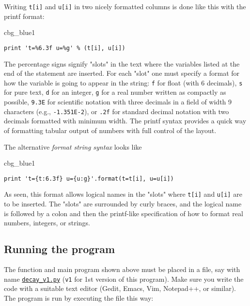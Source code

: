 \documentclass[graybox,sectrefs,envcountresetchap,open=right,final]{svmonodo}
\newenvironment{_cod_tight}[1]{
   \def\FrameCommand{\colorbox{#1}}
   \FrameRule0.6pt\MakeFramed {\FrameRestore}\vskip3mm}
   {\vskip0mm\endMakeFramed}
\newenvironment{cod}[1]{
\bgroup\rmfamily
\fboxsep=0mm\relax
\begin{_cod_tight}{#1}
\list{}{\parsep=-2mm\parskip=0mm\topsep=0pt\leftmargin=2mm
\rightmargin=2\leftmargin\leftmargin=4pt\relax}
\item\relax}
{\endlist\end{_cod_tight}\egroup}
\begin{document}

Writing \texttt{t[i]} and \texttt{u[i]} in two nicely formatted columns is done like
this with the printf format:

\begin{cod}{cbg_blue1}\begin{Verbatim}[numbers=none,fontsize=\fontsize{9pt}{9pt},baselinestretch=0.95,xleftmargin=2mm]
print 't=%6.3f u=%g' % (t[i], u[i])
\end{Verbatim}
\end{cod}
\noindent
The percentage signs signify "slots" in the text where the variables
listed at the end of the statement are inserted. For each "slot" one
must specify a format for how the variable is going to appear in the
string: \texttt{f} for float (with 6 decimals),
\texttt{s} for pure text, \texttt{d} for an integer, \texttt{g} for a real number
written as compactly as possible, \texttt{9.3E} for scientific notation with
three decimals in a field of width 9 characters (e.g., \texttt{-1.351E-2}),
or \texttt{.2f} for standard decimal notation with two decimals
formatted with minimum width. The printf syntax provides a quick way
of formatting tabular output of numbers with full control of the
layout.


The alternative \emph{format string syntax} looks like
\begin{cod}{cbg_blue1}\begin{Verbatim}[numbers=none,fontsize=\fontsize{9pt}{9pt},baselinestretch=0.95,xleftmargin=2mm]
print 't={t:6.3f} u={u:g}'.format(t=t[i], u=u[i])
\end{Verbatim}
\end{cod}
\noindent
As seen, this format allows logical names in the "slots" where
\texttt{t[i]} and \texttt{u[i]} are to be inserted. The "slots" are surrounded
by curly braces, and the logical name is followed by a colon and
then the printf-like specification of how to format real numbers,
integers, or strings.

\subsection{Running the program}

The function and main program shown above must be placed in a file,
say with name \href{{http://tinyurl.com/ofkw6kc/alg/decay_v1.py}}{\nolinkurl{decay_v1.py}} (\texttt{v1} for 1st version of this program).  Make sure you
write the code with a suitable text editor (Gedit, Emacs, Vim,
Notepad++, or similar).  The program is run by executing the file this
way:
\end{document}
